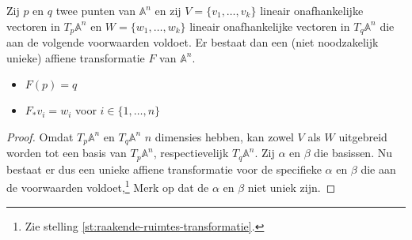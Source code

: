 \documentclass[main.tex]{subfiles}
\begin{document}
\begin{gev}
  Zij $p$ en $q$ twee punten van $\mathbb{A}^{n}$ en zij $V = \{v_{1},\dotsc,v_{k}\}$ lineair onafhankelijke vectoren in $T_{p}\mathbb{A}^{n}$ en $W = \{w_{1},\dotsc,w_{k}\}$ lineair onafhankelijke vectoren in $T_{q}\mathbb{A}^{n}$ die aan de volgende voorwaarden voldoet.
  Er bestaat dan een (niet noodzakelijk unieke) affiene transformatie $F$ van $\mathbb{A}^{n}$.
  \begin{itemize}
  \item $F(p) = q$
  \item $F_{*}v_{i} = w_{i}$ voor $i \in \{ 1,\dotsc,n \}$
  \end{itemize}

  \begin{proof}
    Omdat $T_{p}\mathbb{A}^{n}$ en $T_{q}\mathbb{A}^{n}$ $n$ dimensies hebben, kan zowel $V$ als $W$ uitgebreid worden tot een basis van $T_{p}\mathbb{A}^{n}$, respectievelijk $T_{q}\mathbb{A}^{n}$.
    Zij $\alpha$ en $\beta$ die basissen.
    Nu bestaat er dus een unieke affiene transformatie voor de specifieke $\alpha$ en $\beta$ die aan de voorwaarden voldoet,\footnote{Zie stelling \ref{st:raakende-ruimtes-transformatie}.}
    Merk op dat de $\alpha$ en $\beta$ niet uniek zijn.
  \end{proof}
\end{gev}
\end{document}
